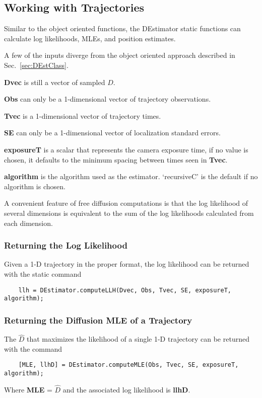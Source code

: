 \documentclass{article}
\begin{document}
\subsection{Working with Trajectories}
Similar to the object oriented functions, the DEstimator static functions can calculate log likelihoods, MLEs, and position estimates.

A few of the inputs diverge from the object oriented approach described in Sec.~\ref{sec:DEstClass}.

\textbf{Dvec} is still a vector of sampled $D$.

\textbf{Obs} can only be a 1-dimensional vector of trajectory observations.

\textbf{Tvec} is a 1-dimensional vector of trajectory times.

\textbf{SE} can only be a 1-dimensional vector of localization standard errors.

\textbf{exposureT} is a scalar that represents the camera exposure time, if no value is chosen, it defaults to the minimum spacing between times seen in \textbf{Tvec}.

\textbf{algorithm} is the algorithm used as the estimator.  `recursiveC' is the default if no algorithm is chosen.

A convenient feature of free diffusion computations is that the log likelihood of several dimensions is equivalent to the sum of the log likelihoods calculated from each dimension.

\subsubsection{Returning the Log Likelihood}
Given a 1-D trajectory in the proper format, the log likelihood can be returned with the static command
\begin{verbatim}
    llh = DEstimator.computeLLH(Dvec, Obs, Tvec, SE, exposureT, algorithm);
\end{verbatim}

\subsubsection{Returning the Diffusion MLE of a Trajectory}
The $\hat{D}$ that maximizes the likelihood of a single 1-D trajectory can be returned with the command
\begin{verbatim}
    [MLE, llhD] = DEstimator.computeMLE(Obs, Tvec, SE, exposureT, algorithm);
\end{verbatim}
Where \textbf{MLE} = $\hat{D}$ and the associated log likelihood is \textbf{llhD}.
\end{document}
